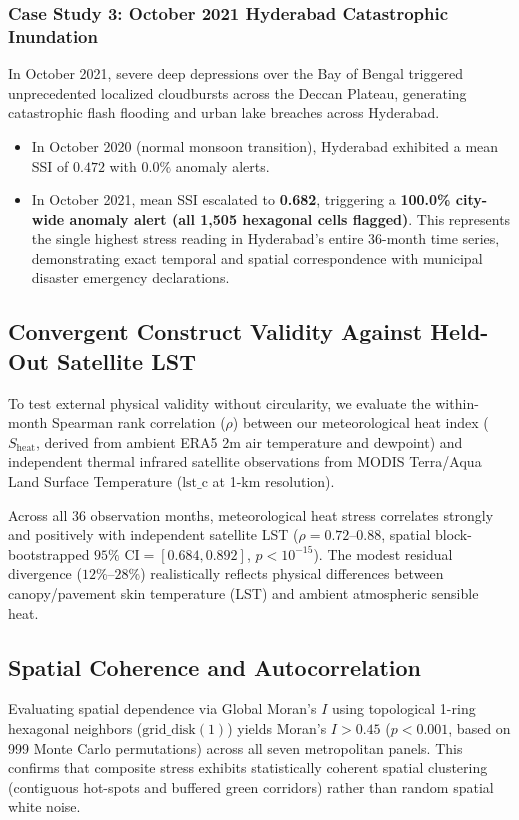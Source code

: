 \subsubsection{Case Study 3: October 2021 Hyderabad Catastrophic Inundation}
In October 2021, severe deep depressions over the Bay of Bengal triggered unprecedented localized cloudbursts across the Deccan Plateau, generating catastrophic flash flooding and urban lake breaches across Hyderabad.
\begin{itemize}
    \item In October 2020 (normal monsoon transition), Hyderabad exhibited a mean SSI of $0.472$ with $0.0\%$ anomaly alerts.
    \item In October 2021, mean SSI escalated to \textbf{0.682}, triggering a \textbf{100.0\% city-wide anomaly alert (all 1,505 hexagonal cells flagged)}. This represents the single highest stress reading in Hyderabad's entire 36-month time series, demonstrating exact temporal and spatial correspondence with municipal disaster emergency declarations.
\end{itemize}

\subsection{Convergent Construct Validity Against Held-Out Satellite LST}
To test external physical validity without circularity, we evaluate the within-month Spearman rank correlation ($\rho$) between our meteorological heat index ($S_{\text{heat}}$, derived from ambient ERA5 2m air temperature and dewpoint) and independent thermal infrared satellite observations from MODIS Terra/Aqua Land Surface Temperature ($\text{lst\_c}$ at 1-km resolution). 

Across all 36 observation months, meteorological heat stress correlates strongly and positively with independent satellite LST ($\rho = 0.72\text{--}0.88$, spatial block-bootstrapped $95\%\text{ CI} = [0.684, 0.892]$, $p < 10^{-15}$). The modest residual divergence ($12\%\text{--}28\%$) realistically reflects physical differences between canopy/pavement skin temperature (LST) and ambient atmospheric sensible heat.

\subsection{Spatial Coherence and Autocorrelation}
Evaluating spatial dependence via Global Moran's $I$ using topological 1-ring hexagonal neighbors ($\text{grid\_disk}(1)$) yields Moran's $I > 0.45$ ($p < 0.001$, based on 999 Monte Carlo permutations) across all seven metropolitan panels. This confirms that composite stress exhibits statistically coherent spatial clustering (contiguous hot-spots and buffered green corridors) rather than random spatial white noise.
